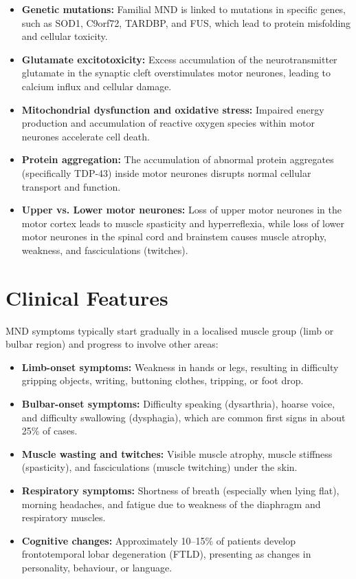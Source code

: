 \begin{itemize}
    \item \textbf{Genetic mutations:} Familial MND is linked to mutations in specific genes, such as SOD1, C9orf72, TARDBP, and FUS, which lead to protein misfolding and cellular toxicity.
    \item \textbf{Glutamate excitotoxicity:} Excess accumulation of the neurotransmitter glutamate in the synaptic cleft overstimulates motor neurones, leading to calcium influx and cellular damage.
    \item \textbf{Mitochondrial dysfunction and oxidative stress:} Impaired energy production and accumulation of reactive oxygen species within motor neurones accelerate cell death.
    \item \textbf{Protein aggregation:} The accumulation of abnormal protein aggregates (specifically TDP-43) inside motor neurones disrupts normal cellular transport and function.
    \item \textbf{Upper vs. Lower motor neurones:} Loss of upper motor neurones in the motor cortex leads to muscle spasticity and hyperreflexia, while loss of lower motor neurones in the spinal cord and brainstem causes muscle atrophy, weakness, and fasciculations (twitches).
\end{itemize}

\section*{Clinical Features}
MND symptoms typically start gradually in a localised muscle group (limb or bulbar region) and progress to involve other areas:

\begin{itemize}
    \item \textbf{Limb-onset symptoms:} Weakness in hands or legs, resulting in difficulty gripping objects, writing, buttoning clothes, tripping, or foot drop.
    \item \textbf{Bulbar-onset symptoms:} Difficulty speaking (dysarthria), hoarse voice, and difficulty swallowing (dysphagia), which are common first signs in about 25\% of cases.
    \item \textbf{Muscle wasting and twitches:} Visible muscle atrophy, muscle stiffness (spasticity), and fasciculations (muscle twitching) under the skin.
    \item \textbf{Respiratory symptoms:} Shortness of breath (especially when lying flat), morning headaches, and fatigue due to weakness of the diaphragm and respiratory muscles.
    \item \textbf{Cognitive changes:} Approximately 10--15\% of patients develop frontotemporal lobar degeneration (FTLD), presenting as changes in personality, behaviour, or language.
\end{itemize}

